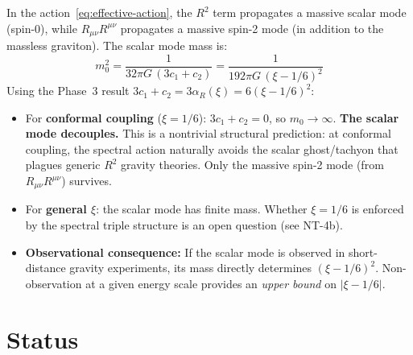 \documentclass[11pt,a4paper]{article}
\begin{document}
In the action~\eqref{eq:effective-action}, the $R^2$ term propagates a massive scalar mode
(spin-0), while $R_{\mu\nu}R^{\mu\nu}$ propagates a massive spin-2 mode (in addition to
the massless graviton). The scalar mode mass is:
\begin{equation}
  m_0^2 = \frac{1}{32\pi G\,(3c_1 + c_2)} = \frac{1}{192\pi G\,(\xi - 1/6)^2}
\end{equation}
Using the Phase~3 result $3c_1 + c_2 = 3\alpha_R(\xi) = 6(\xi - 1/6)^2$:
\begin{itemize}
  \item For \textbf{conformal coupling} ($\xi = 1/6$): $3c_1 + c_2 = 0$, so $m_0 \to \infty$.
    \textbf{The scalar mode decouples.} This is a nontrivial structural prediction:
    at conformal coupling, the spectral action naturally avoids the scalar ghost/tachyon
    that plagues generic $R^2$ gravity theories. Only the massive spin-2 mode
    (from $R_{\mu\nu}R^{\mu\nu}$) survives.
  \item For \textbf{general $\xi$}: the scalar mode has finite mass. Whether $\xi = 1/6$
    is enforced by the spectral triple structure is an open question (see NT-4b).
  \item \textbf{Observational consequence:} If the scalar mode is observed in short-distance
    gravity experiments, its mass directly determines $(\xi - 1/6)^2$. Non-observation
    at a given energy scale provides an \emph{upper bound} on $|\xi - 1/6|$.
\end{itemize}

\section{Status}
\end{document}
